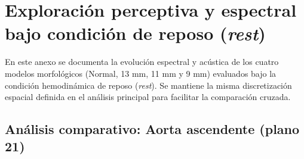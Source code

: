 \begin{table}[H]
\centering
\caption{Tabla de contingencia: Distribución de planos anatómicos por clúster para el dominio multimodal.}
\label{tab:anexo_multimodal}
\end{table}

\section{Exploración perceptiva y espectral bajo condición de reposo (\textit{rest})}
\label{anexo:comparacion_casos}
En este anexo se documenta la evolución espectral y acústica de los cuatro modelos morfológicos (Normal, 13 mm, 11 mm y 9 mm) evaluados bajo la condición hemodinámica de reposo (\textit{rest}). Se mantiene la misma discretización espacial definida en el análisis principal para facilitar la comparación cruzada.

\subsection{Análisis comparativo: Aorta ascendente (plano 21)}


